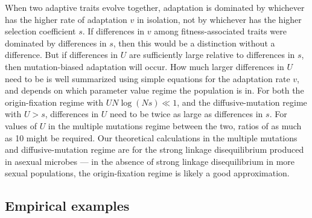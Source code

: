 \documentclass[9pt,twocolumn,twoside]{article}
\begin{document}
When two adaptive traits evolve together, adaptation is dominated by whichever has the higher rate of adaptation $v$ in isolation, not by whichever has the higher selection coefficient $s$. If differences in $v$ among fitness-associated traits were dominated by differences in $s$, then this would be a distinction without a difference. But if differences in $U$ are sufficiently large relative to differences in $s$, then mutation-biased adaptation will occur. How much larger differences in $U$ need to be is well summarized using simple equations for the adaptation rate $v$, and depends on which parameter value regime the population is in. For both the origin-fixation regime with $UN \log(Ns) \ll 1$, and the diffusive-mutation regime with $U>s$, differences in $U$ need to be twice as large as differences in $s$. For values of $U$ in the multiple mutations regime between the two, ratios of as much as 10 might be required. Our theoretical calculations in the multiple mutations and diffusive-mutation regime are for the strong linkage disequilibrium produced in asexual microbes --- in the absence of strong linkage disequilibrium in more sexual populations, the origin-fixation regime is likely a good approximation. 

\subsection{Empirical examples}
\end{document}
